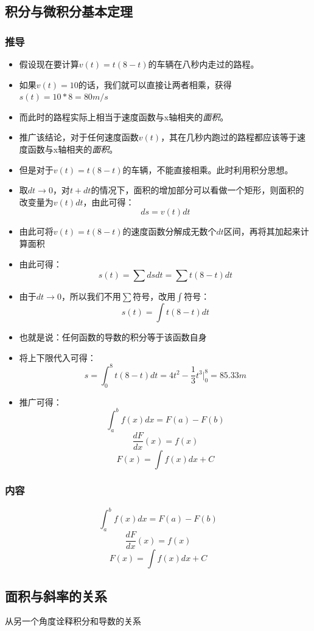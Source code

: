 \documentclass[UTF8]{ctexart}
\begin{document}
\subsection{积分与微积分基本定理}
\subsubsection{推导}
\begin{itemize}
	\item 假设现在要计算$v(t) = t(8-t)$的车辆在八秒内走过的路程。
	\item 如果$v(t) = 10$的话，我们就可以直接让两者相乘，获得$s(t) = 10*8 = 80m/s$
	\item 而此时的路程实际上相当于速度函数与x轴相夹的\emph{面积}。
	\item 推广该结论，对于任何速度函数$v(t)$，其在几秒内跑过的路程都应该等于速度函数与x轴相夹的\emph{面积}。
	\item 但是对于$v(t) = t(8-t)$的车辆，不能直接相乘。此时利用积分思想。
	\item 取$dt\to0$，对$t+dt$的情况下，面积的增加部分可以看做一个矩形，则面积的改变量为$v(t)dt$，由此可得：$$ds=v(t)dt$$
	\item 由此可将$v(t) = t(8-t)$的速度函数分解成无数个$dt$区间，再将其加起来计算面积
	\item 由此可得：$$s(t) = \sum dsdt= \sum t(8-t)dt$$
	\item 由于$dt\to0$，所以我们不用$\sum$符号，改用$\int$符号：$$s(t) = \int t(8-t)dt$$
	\item 也就是说：任何函数的导数的积分等于该函数自身
	\item 将上下限代入可得：$$s = \int_0^8t(8-t)dt = 4t^2-\frac{1}{3}t^3|_0^8 = 85.33m$$
	\item 推广可得：$$\int_a^bf(x)dx = F(a) - F(b)$$ $$\frac{dF}{dx}(x) = f(x)$$ $$F(x) = \int f(x)dx+C$$
\end{itemize}
\subsubsection{内容}
$$\int_a^bf(x)dx = F(a) - F(b)$$
$$\frac{dF}{dx}(x) = f(x)$$ 
$$F(x) = \int f(x)dx+C$$

\subsection{面积与斜率的关系}
从另一个角度诠释积分和导数的关系
\end{document}
